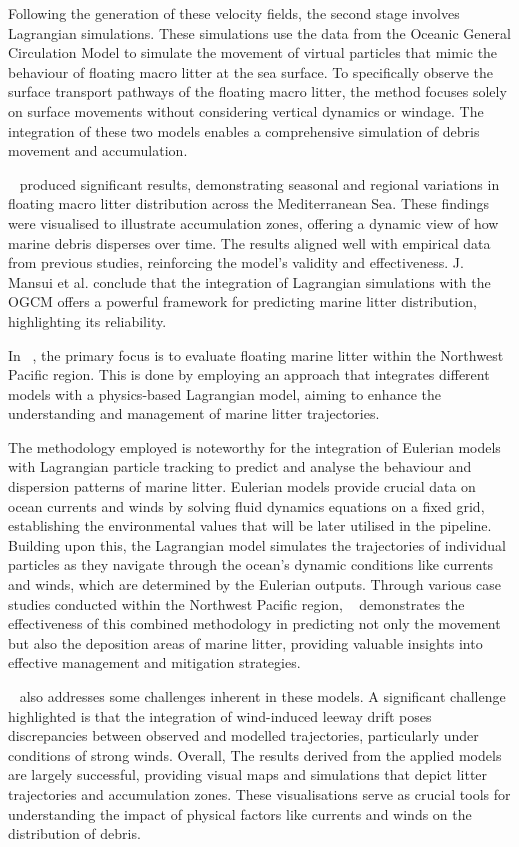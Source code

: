 Following the generation of these velocity fields, the second stage involves Lagrangian simulations. These simulations use the data from the Oceanic General Circulation Model to simulate the movement of virtual particles that mimic the behaviour of floating macro litter at the sea surface.  To specifically observe the surface transport pathways of the floating macro litter, the method focuses solely on surface movements without considering vertical dynamics or windage. The integration of these two models enables a comprehensive simulation of debris movement and accumulation. 

~\cite{45} produced significant results, demonstrating seasonal and regional variations in floating macro litter distribution across the Mediterranean Sea. These findings were visualised to illustrate accumulation zones, offering a dynamic view of how marine debris disperses over time. The results aligned well with empirical data from previous studies, reinforcing the model's validity and effectiveness. J. Mansui et al. conclude that the integration of Lagrangian simulations with the OGCM offers a powerful framework for predicting marine litter distribution, highlighting its reliability.

In ~\cite{46}, the primary focus is to evaluate floating marine litter within the Northwest Pacific region. This is done by employing an approach that integrates different models with a physics-based Lagrangian model, aiming to enhance the understanding and management of marine litter trajectories.

The methodology employed is noteworthy for the integration of Eulerian models with Lagrangian particle tracking to predict and analyse the behaviour and dispersion patterns of marine litter. Eulerian models provide crucial data on ocean currents and winds by solving fluid dynamics equations on a fixed grid, establishing the environmental values that will be later utilised in the pipeline. Building upon this, the Lagrangian  model simulates the trajectories of individual particles as they navigate through the ocean's dynamic conditions like currents and winds, which are determined by the Eulerian outputs. Through various case studies conducted within the Northwest Pacific region, ~\cite{46} demonstrates the effectiveness of this combined methodology in predicting not only the movement but also the deposition areas of marine litter, providing valuable insights into effective management and mitigation strategies.

~\cite{46} also addresses some challenges inherent in these models. A significant challenge highlighted is that the integration of wind-induced leeway drift poses discrepancies between observed and modelled trajectories, particularly under conditions of strong winds. Overall, The results derived from the applied models are largely successful, providing visual maps and simulations that depict litter trajectories and accumulation zones. These visualisations serve as crucial tools for understanding the impact of physical factors like currents and winds on the distribution of debris.

